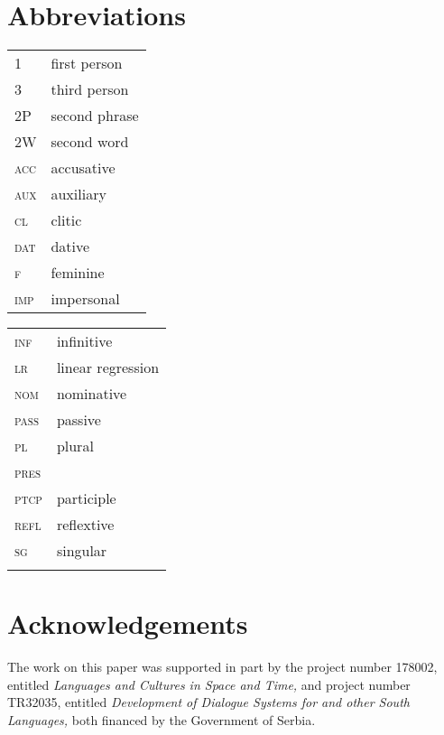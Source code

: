 \documentclass[output=paper,modfonts,newtxmath,hidelinks,]{langscibook}
\begin{document}
\section*{Abbreviations}

\begin{tabularx}{.5\textwidth}{@{}lQ@{}}
\textsc{1}&first person\\
\textsc{3}&third person\\
2P&second phrase\\
2W&second word\\
\textsc{acc}&{accusative}\\
\textsc{aux}&auxiliary\\
\textsc{cl}&{clitic}\\
\textsc{dat}&{dative}\\
\textsc{f}&{feminine}\\
\textsc{imp}&impersonal\\
\end{tabularx}%
\begin{tabularx}{.5\textwidth}{@{}lQ@{}}
\textsc{inf}&{infinitive}\\
\textsc{lr}&linear regression\\
\textsc{nom}&{nominative}\\
\textsc{pass}&passive\\
\textsc{pl}&{plural}\\
 \textsc{pres}&\\
\textsc{ptcp}&{participle}\\
\textsc{refl}&reflextive\\
\textsc{sg}&singular\\
&\\
\end{tabularx}

\section*{Acknowledgements}

The work on this paper was supported in part by the project number 178002, entitled \textit{Languages and Cultures in Space and Time,} and project number TR32035, entitled \textit{Development of Dialogue Systems for  and other South  Languages,} both financed by the Government of Serbia.
\sloppy
\printbibliography[heading=subbibliography,notkeyword=this]
\end{document}
